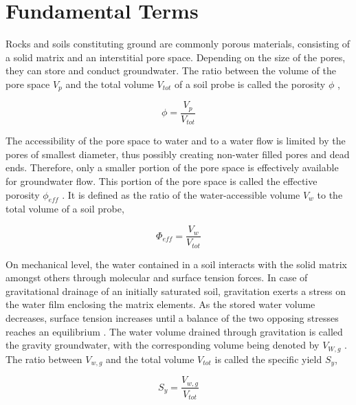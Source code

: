 


\section{Fundamental Terms}
\label{Sec-TheoFundTerms}

Rocks and soils constituting ground are commonly porous materials, consisting of a solid matrix and an interstitial pore space. Depending on the size of the pores, they can store and conduct groundwater. The ratio between the volume of the pore space $V_p$ and the total volume $V_{tot}$ of a soil probe is called the porosity $\phi$ \parencite{Fetter.2001},

\begin{equation}
    \label{Eq-Porosity}
    \phi = \frac{V_p}{V_{tot}}
\end{equation}

The accessibility of the pore space to water and to a water flow is limited by the pores of smallest diameter, thus possibly creating non-water filled pores and dead ends. Therefore, only a smaller portion of the pore space is effectively available for groundwater flow. This portion of the pore space is called the effective porosity $\phi_{eff}$ \parencite{Fetter.2001}. It is defined as the ratio of the water-accessible volume $V_w$ to the total volume of a soil probe,

\begin{equation}
    \label{Eq-PorEff}
    \Phi_{eff} = \frac{V_w}{V_{tot}}
\end{equation}

On mechanical level, the water contained in a soil interacts with the solid matrix amongst others through molecular and surface tension forces. In case of gravitational drainage of an initially saturated soil, gravitation exerts a stress on the water film enclosing the matrix elements. As the stored water volume decreases, surface tension increases until a balance of the two opposing stresses reaches an equilibrium \parencite{Fetter.2001}. The water volume drained through gravitation is called the gravity groundwater, with the corresponding volume being denoted by $V_{W,g}$ \parencite{Johnson.1967}. The ratio between $V_{w,g}$ and the total volume $V_{tot}$ is called the specific yield $S_y$,

\begin{equation}
    \label{Eq-Sy}
    S_y = \frac{V_{w,g}}{V_{tot}}
\end{equation}

